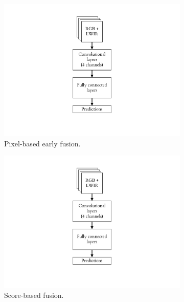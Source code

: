 \documentclass{l4proj}
\begin{document}
\begin{figure}[ht]
  \centering
  \begin{subfigure}[h!]{0.3\textwidth}
    \includegraphics[width=\textwidth, page={1}, trim={6.5cm 2.2cm 6.5cm 1.5cm}, clip]{images/models/archs}
    \caption{Pixel-based early fusion.}
    \label{fig:arch_stacked}
  \end{subfigure}
  \quad
  \begin{subfigure}[h!]{0.3\textwidth}
    \includegraphics[width=\textwidth, page={2}, trim={6.5cm 2.2cm 6.5cm 1.5cm}, clip]{images/models/archs}
    \caption{Score-based fusion.}
    \label{fig:arch_combsum}
  \end{subfigure}
  \quad
  \begin{subfigure}[h!]{0.3\textwidth}

\end{subfigure}
\end{figure}
\end{document}
